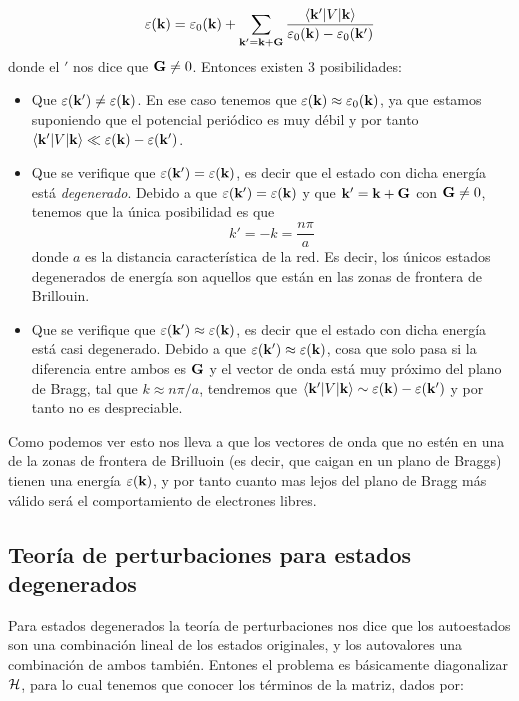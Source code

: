 \begin{equation}
	\varepsilon(\mathbf{k})  =\varepsilon_0 (\mathbf{k}) + \sum_{\mathbf{k}'=\mathbf{k}+\mathbf{G}} \frac{\langle \mathbf{k}' |V|\mathbf{k} \rangle}{  \varepsilon_0 (\mathbf{k}) - \varepsilon_0 (\mathbf{k}')}
\end{equation}
donde el $'$ nos dice que $\mathbf{G} \neq 0$. Entonces existen 3 posibilidades:

\begin{itemize}
	\item Que $\varepsilon(\mathbf{k}')\neq \varepsilon(\mathbf{k})$. En ese caso tenemos que $\varepsilon(\mathbf{k}) \approx \varepsilon_0(\mathbf{k})$, ya que estamos suponiendo que el potencial periódico es muy débil y por  tanto $\langle \mathbf{k}' |V|\mathbf{k} \rangle \ll \varepsilon(\mathbf{k}) - \varepsilon(\mathbf{k}')$. 
	\item Que se verifique que $\varepsilon(\mathbf{k}')=\varepsilon(\mathbf{k})$, es decir que el estado con dicha energía está \textit{degenerado}. Debido a que $\varepsilon(\mathbf{k}')=\varepsilon(\mathbf{k})$ y que $\mathbf{k}'=\mathbf{k}+\mathbf{G}$ con $\mathbf{G}\neq 0$, tenemos que la única posibilidad es que 
	\begin{equation}
		k'=-k = \frac{n\pi}{a}
	\end{equation}
	donde $a$ es la distancia característica de la red.	Es decir, los únicos estados degenerados de energía son aquellos que están en las zonas de frontera de Brillouin.
	\item Que se verifique que $\varepsilon(\mathbf{k}')\approx\varepsilon(\mathbf{k})$, es decir que el estado con dicha energía está casi degenerado. Debido a que $\varepsilon(\mathbf{k}')\approx\varepsilon(\mathbf{k})$, cosa que solo pasa si la diferencia entre ambos es $\mathbf{G}$ y el vector de onda está muy próximo del plano de Bragg, tal que $k\approx n\pi/a$, tendremos que $\langle \mathbf{k}' |V|\mathbf{k} \rangle \sim \varepsilon(\mathbf{k}) - \varepsilon(\mathbf{k}')$ y por tanto no es despreciable.
	
\end{itemize}	

Como podemos ver esto nos lleva a que los vectores de onda que no estén en una de la zonas de frontera de Brilluoin (es decir, que caigan en un plano de Braggs) tienen una energía $\varepsilon(\mathbf{k})$, y por tanto cuanto mas lejos del plano de Bragg más válido será el comportamiento de electrones libres.

\subsection{Teoría de perturbaciones para estados degenerados}

Para estados degenerados la teoría de perturbaciones nos dice que los autoestados son una combinación lineal de los estados originales, y los autovalores una combinación de ambos también. Entones el problema es básicamente diagonalizar $\mathcal{H}$, para lo cual tenemos que conocer los términos de la matriz, dados por:

